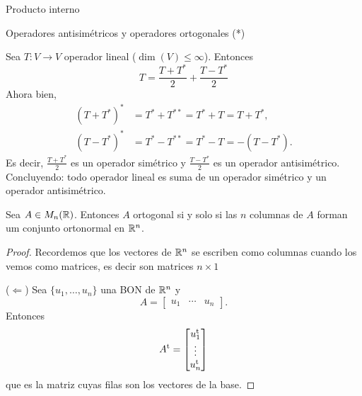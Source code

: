 \begin{chapter}{Producto interno}
\begin{section}{Operadores antisim\'etricos y operadores ortogonales (*)}
\begin{ejercicio*}
            
        \end{ejercicio*}
        
        \begin{observacion*}
            Sea $T:V\to V$ operador lineal ($\dim(V)\le \infty$). Entonces 
            $$
            T = \frac{T+T^*}{2} + \frac{T-T^*}2
            $$ 
            Ahora bien, 
            \begin{align*}
                (T+T^*)^* &= T^* + T^{**} =T^* + T = T+T^*, \\
                (T-T^*)^* &= T^* - T^{**} =T^* - T = -(T-T^*).
            \end{align*}
         Es decir, $\displaystyle{\frac{T+T^*}{2}}$  es un  operador simétrico y  $\displaystyle{\frac{T-T^*}{2}}$ es un operador antisimétrico. Concluyendo: todo operador lineal es suma de un operador simétrico y un operador antisimétrico.  
        \end{observacion*}
            
        
        
        \begin{proposicion} Sea $A \in  M_{n}(\mathbb R)$. Entonces $A$ ortogonal si y solo si  las $n$ columnas de $A$ forman um conjunto ortonormal en $\mathbb R^n$. 
        \end{proposicion} 
        \begin{proof}
            Recordemos que los vectores de $\mathbb R^n$ se escriben como columnas cuando los vemos como matrices,  es decir son matrices $n \times 1$
            
            ($\Leftarrow$)
            Sea $\{u_1,\ldots,u_n\}$ una BON de $\mathbb R^n$ y
            $$ A = \begin{bmatrix}
            u_1 & \cdots & u_n
            \end{bmatrix}. 
            $$
            Entonces
            $$
            A^{{\operatorname{t}}} = \begin{bmatrix}
            u_1^{{\operatorname{t}}} \\ \vdots \\ u_n^{{\operatorname{t}}}
            \end{bmatrix}
            $$
            que es la matriz cuyas filas son los vectores de la base.
            

\end{proof}
\end{section}
\end{chapter}
